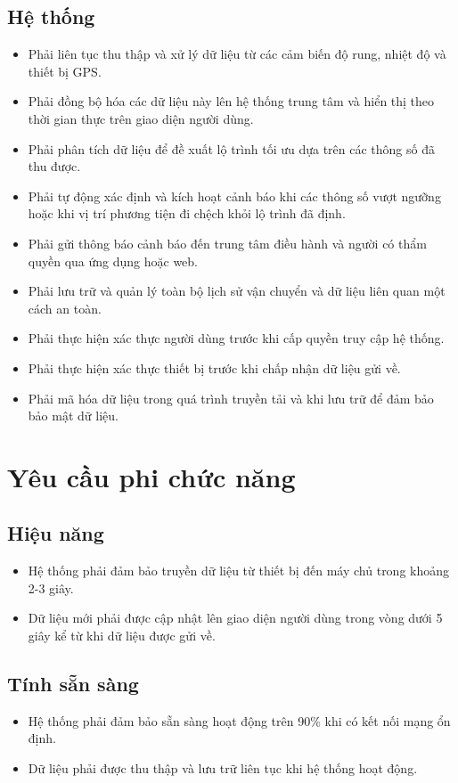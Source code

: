 \subsection{Hệ thống}
\begin{itemize}
    \item Phải liên tục thu thập và xử lý dữ liệu từ các cảm biến độ rung, nhiệt độ và thiết bị GPS.
    \item Phải đồng bộ hóa các dữ liệu này lên hệ thống trung tâm và hiển thị theo thời gian thực trên giao diện người dùng.
    \item Phải phân tích dữ liệu để đề xuất lộ trình tối ưu dựa trên các thông số đã thu được.
    \item Phải tự động xác định và kích hoạt cảnh báo khi các thông số vượt ngưỡng hoặc khi vị trí phương tiện đi chệch khỏi lộ trình đã định.
    \item Phải gửi thông báo cảnh báo đến trung tâm điều hành và người có thẩm quyền qua ứng dụng hoặc web.
    \item Phải lưu trữ và quản lý toàn bộ lịch sử vận chuyển và dữ liệu liên quan một cách an toàn.
    \item Phải thực hiện xác thực người dùng trước khi cấp quyền truy cập hệ thống.
    \item Phải thực hiện xác thực thiết bị trước khi chấp nhận dữ liệu gửi về.
    \item Phải mã hóa dữ liệu trong quá trình truyền tải và khi lưu trữ để đảm bảo bảo mật dữ liệu.
\end{itemize}
\section{Yêu cầu phi chức năng}
\subsection{Hiệu năng}
\begin{itemize}
    \item Hệ thống phải đảm bảo truyền dữ liệu từ thiết bị đến máy chủ trong khoảng 2-3 giây.
    \item Dữ liệu mới phải được cập nhật lên giao diện người dùng trong vòng dưới 5 giây kể từ khi dữ liệu được gửi về.
\end{itemize}

\subsection{Tính sẵn sàng}
\begin{itemize}
    \item Hệ thống phải đảm bảo sẵn sàng hoạt động trên 90\% khi có kết nối mạng ổn định.
    \item Dữ liệu phải được thu thập và lưu trữ liên tục khi hệ thống hoạt động.
\end{itemize}

